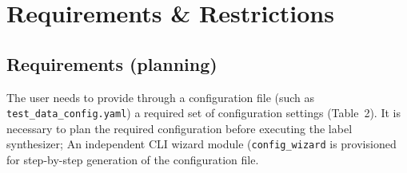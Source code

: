 \documentclass[a4paper,11pt]{article}
\begin{document}
\newpage

\section{\texorpdfstring{\quad Requirements \& Restrictions}{Requirements \& Restrictions}}
\subsection{\texorpdfstring{\quad Requirements}{Requirements} (planning)}
The user needs to provide through a configuration file (such as \texttt{test\_data\_config.yaml}) a required set of configuration settings (Table~2). It is necessary to plan the required configuration before executing the label synthesizer; An independent CLI wizard module (\texttt{config\_wizard} is provisioned for step-by-step generation of the configuration file.
\end{document}

